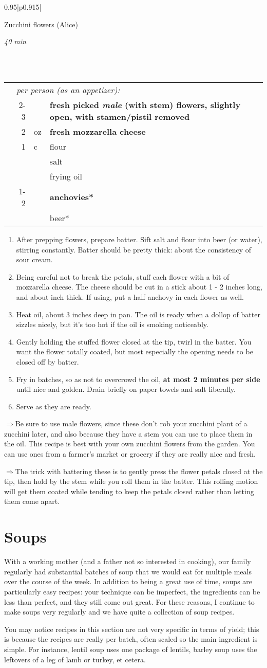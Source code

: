 \documentclass[8pt]{report}
\newcommand{\ingredmargin}{0.25cm}
\newcommand{\recipegroup}[2]{\chapter*{#1} \addcontentsline{toc}{chapter}{#1} \label{chap:#1} \vspace{4cm} {#2} \newpage}
\newcommand{\fr}[2]{\nicefrac{#1}{#2}}
\newenvironment{creditrecipe}[4]
  {\bigskip \bigskip 
\begin{tabular*}{0.95\textwidth}{|p{0.915\textwidth}|} \hline \vspace{0.25mm}
\begin{minipage}{0.7\textwidth}	\begin{flushleft} {\Large \textsf{#1} (#4)} \end{flushleft} \end{minipage}
\begin{minipage}{0.2\textwidth} \begin{flushright} \emph{#2} \end{flushright} \end{minipage} \\ \\ \hline
\begin{ingreds}{#3} \addcontentsline{toc}{section}{#1} \phantomsection \label{rec:#1}} 
  {\\ \hline \end{tabular*} \noindent}
\newenvironment{ingreds}[1]
  {\begin{tabular}{lrlp{0.6\textwidth}} \hspace{\ingredmargin} & \multicolumn{3}{l}{\it #1:} \\}
  {\end{tabular} \medskip}
\newcommand{\ingredsdone}{\end{ingreds}\begin{enumerate}}
\newcommand{\stepsdone}{\end{enumerate} \medskip}
\newcommand{\notefont}{\renewcommand*\rmdefault{pzc}\normalfont\upshape \large}
\newcommand{\ingredient}[3]{\hspace{\ingredmargin} & #1 & #2 & #3 \\}
\newcommand{\tip}{$\Rightarrow$}
\begin{document}
\begin{creditrecipe}{Zucchini flowers}{40 min}{per person (as an appetizer)}{Alice}
\index{zucchini!flowers} \index{vegetables!zucchini flowers} \index{appetizers!zucchini flowers}
\ingredient{2-3}{}{\bf fresh picked {\em male} (with stem) flowers, slightly open, with stamen/pistil removed}
\ingredient{2}{oz}{\bf fresh mozzarella cheese}
\ingredient{1}{c}{flour}
\ingredient{}{}{salt}
\ingredient{}{}{frying oil}
\ingredient{1-2}{}{\bf anchovies*}
\ingredient{}{}{beer*}
\ingredsdone
\item After prepping flowers, prepare batter.  Sift salt and flour into beer (or water), stirring constantly.  Batter should be pretty thick: about the consistency of sour cream.
\item Being careful not to break the petals, stuff each flower with a bit of mozzarella cheese.  The cheese should be cut in a stick about 1 \fr12 - 2 inches long,
and about \fr12 inch thick.  If using, put a half anchovy in each flower as well.
\item Heat oil, about 3 inches deep in pan.  The oil is ready when a dollop of batter sizzles nicely, but it's too hot if the oil is smoking noticeably.
\item Gently holding the stuffed flower closed at the tip, twirl in the batter.  You want the flower totally coated, but most especially the opening needs to be closed
off by batter.
\item Fry in batches, so as not to overcrowd the oil, {\bf at most 2 minutes per side} until nice and golden.  Drain briefly on paper towels and salt liberally.
\item Serve as they are ready.  
\stepsdone
\noindent \tip Be sure to use male flowers, since these don't rob your zucchini plant of a zucchini later, and also because they have a stem you can use to place 
them in the oil.  This recipe is best with your own zucchini flowers from the garden.  You can use ones from a farmer's market or grocery if they are really nice and
fresh. \medskip

\noindent \tip The trick with battering these is to gently press the flower petals closed at the tip, then hold by the stem while you roll them in the batter.  This
rolling motion will get them coated while tending to keep the petals closed rather than letting them come apart.
\end{creditrecipe}

\recipegroup{Soups}{\notefont With a working mother (and a father not so interested in cooking), our family regularly had substantial batches of soup that we would eat for multiple meals over the course of the week.  In addition to being a great use of time, soups are particularly easy recipes: your technique can be imperfect, the ingredients can be less than perfect, and they still come out great.  For these reasons, I continue to make soups very regularly and we have quite a collection of soup recipes.

You may notice recipes in this section are not very specific in terms of yield; this is because the recipes are really per batch, often scaled so the main ingredient is simple.  For instance, lentil soup uses one package of lentils, barley soup uses the leftovers of a leg of lamb or turkey, et cetera.}
\end{document}
